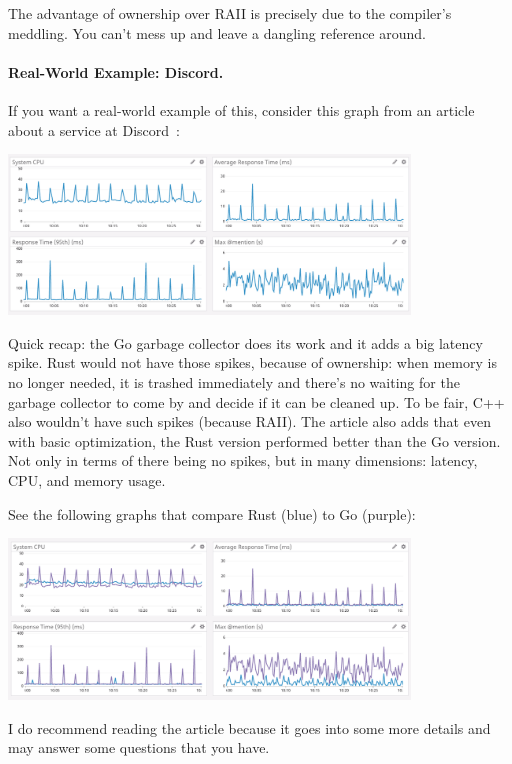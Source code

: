 \documentclass[a4paper]{report}
\begin{document}
The advantage of ownership over RAII is precisely due to the compiler's meddling. You can't mess up and leave a dangling reference around.

\paragraph{Real-World Example: Discord.} If you want a real-world example of this, consider this graph from an article about a service at Discord~\cite{discord}:

\begin{center}
\includegraphics[width=0.8\textwidth]{images/golang-gc.png}
\end{center}

Quick recap: the Go garbage collector does its work and it adds a big latency spike. Rust would not have those spikes, because of ownership: when memory is no longer needed, it is trashed immediately and there's no waiting for the garbage collector to come by and decide if it can be cleaned up. To be fair, C++ also wouldn't have such spikes (because RAII). The article also adds that even with basic optimization, the Rust version performed better than the Go version. Not only in terms of there being no spikes, but in many dimensions: latency, CPU, and memory usage.

See the following graphs that compare Rust (blue) to Go (purple): 
\begin{center}
\includegraphics[width=0.8\textwidth]{images/rust-vs-go.png}
\end{center}

I do recommend reading the article because it goes into some more details and may answer some questions that you have. 
\end{document}
